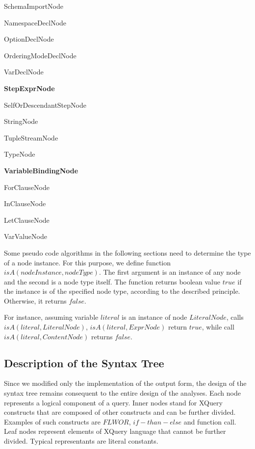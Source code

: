 \begin{description}
\begin{description}
\begin{description}
\begin{description}
    \item SchemaImportNode
    \end{description}
  \item NamespaceDeclNode
  \item OptionDeclNode
  \item OrderingModeDeclNode
  \item VarDeclNode
  \end{description}
\item \textbf{StepExprNode}
  \begin{description}
  \item SelfOrDescendantStepNode
  \end{description}
\item StringNode
\item TupleStreamNode
\item TypeNode
\item \textbf{VariableBindingNode}
  \begin{description}
  \item ForClauseNode
  \item InClauseNode
  \item LetClauseNode
  \end{description}
\item VarValueNode
\end{description}
\end{description}

Some pseudo code algorithms in the following sections need to determine the type of a node instance. For this purpose, we define function $isA(nodeInstance, nodeType)$. The first argument is an instance of any node and the second is a node type itself. The function returns boolean value $true$ if the instance is of the specified node type, according to the described principle. Otherwise, it returns $false$.

For instance, assuming variable $literal$ is an instance of node $LiteralNode$, calls $isA(literal, LiteralNode)$, $isA(literal, ExprNode)$ return $true$, while call $isA(literal, ContentNode)$ returns $false$.

\subsection{Description of the Syntax Tree}
Since we modified only the implementation of the output form, the design of the syntax tree remains consequent to the entire design of the analyses. Each node represents a logical component of a query. Inner nodes stand for XQuery constructs that are composed of other constructs and can be further divided. Examples of such constructs are $FLWOR$, $if-than-else$ and function call. Leaf nodes represent elements of XQuery language that cannot be further divided. Typical representants are literal constants. 


